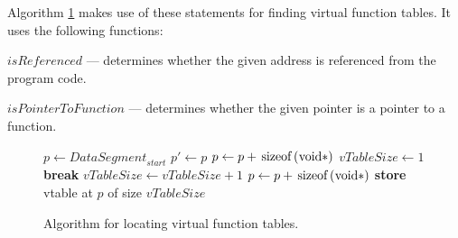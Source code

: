 \documentclass[times, 10pt,twocolumn]{article}
\begin{document}
Algorithm \ref{alg:find_vtables} makes use of these statements
for finding virtual function tables. It uses the following functions:

$\textit{isReferenced}$ --- determines whether the given address
is referenced from the program code.

$\textit{isPointerToFunction}$ --- determines whether the given pointer
is a pointer to a function.

\begin{figure}[htb!]
\begin{algorithmic}[1]
\STATE $p \gets \textit{DataSegment}_{\textit{start}}$
    \STATE $p' \gets p$
    \STATE $p \gets p + \text{\lstinline{sizeof(void*)}}$
        \STATE $\textit{vTableSize} \gets 1$
        \LOOP
                \STATE \textbf{break}
            \ENDIF
            \STATE $\textit{vTableSize} \gets \textit{vTableSize} + 1$
            \STATE $p \gets p + \text{\lstinline{sizeof(void*)}}$
        \ENDLOOP
        \STATE \textbf{store} vtable at $p$ of size $\textit{vTableSize}$
    \ENDIF
\ENDWHILE
\end{algorithmic}
\caption{Algorithm for locating virtual function tables.}
\label{alg:find_vtables}
\end{figure}
\fi
\end{document}
